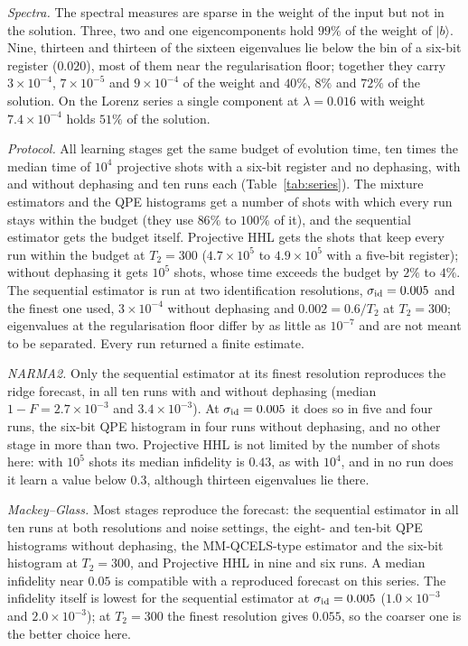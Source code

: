\documentclass[journal]{IEEEtran}
\begin{document}
\emph{Spectra.} The spectral measures are sparse in the weight of the input but not in the solution. Three, two and one eigencomponents hold $99\%$ of the weight of $|b\rangle$. Nine, thirteen and thirteen of the sixteen eigenvalues lie below the bin of a six-bit register ($0.020$), most of them near the regularisation floor; together they carry $3\times10^{-4}$, $7\times10^{-5}$ and $9\times10^{-4}$ of the weight and $40\%$, $8\%$ and $72\%$ of the solution. On the Lorenz series a single component at $\lambda=0.016$ with weight $7.4\times10^{-4}$ holds $51\%$ of the solution.

\emph{Protocol.} All learning stages get the same budget of evolution time, ten times the median time of $10^4$ projective shots with a six-bit register and no dephasing, with and without dephasing and ten runs each (Table~\ref{tab:series}). The mixture estimators and the QPE histograms get a number of shots with which every run stays within the budget (they use $86\%$ to $100\%$ of it), and the sequential estimator gets the budget itself. Projective HHL gets the shots that keep every run within the budget at $T_2=300$ ($4.7\times10^5$ to $4.9\times10^5$ with a five-bit register); without dephasing it gets $10^5$ shots, whose time exceeds the budget by $2\%$ to $4\%$. The sequential estimator is run at two identification resolutions, $\sigma_{\rm id}=0.005$ and the finest one used, $3\times10^{-4}$ without dephasing and $0.002=0.6/T_2$ at $T_2=300$; eigenvalues at the regularisation floor differ by as little as $10^{-7}$ and are not meant to be separated. Every run returned a finite estimate.

\emph{NARMA2.} Only the sequential estimator at its finest resolution reproduces the ridge forecast, in all ten runs with and without dephasing (median $1-F=2.7\times10^{-3}$ and $3.4\times10^{-3}$). At $\sigma_{\rm id}=0.005$ it does so in five and four runs, the six-bit QPE histogram in four runs without dephasing, and no other stage in more than two. Projective HHL is not limited by the number of shots here: with $10^5$ shots its median infidelity is $0.43$, as with $10^4$, and in no run does it learn a value below $0.3$, although thirteen eigenvalues lie there.

\emph{Mackey--Glass.} Most stages reproduce the forecast: the sequential estimator in all ten runs at both resolutions and noise settings, the eight- and ten-bit QPE histograms without dephasing, the MM-QCELS-type estimator and the six-bit histogram at $T_2=300$, and Projective HHL in nine and six runs. A median infidelity near $0.05$ is compatible with a reproduced forecast on this series. The infidelity itself is lowest for the sequential estimator at $\sigma_{\rm id}=0.005$ ($1.0\times10^{-3}$ and $2.0\times10^{-3}$); at $T_2=300$ the finest resolution gives $0.055$, so the coarser one is the better choice here.
\end{document}
